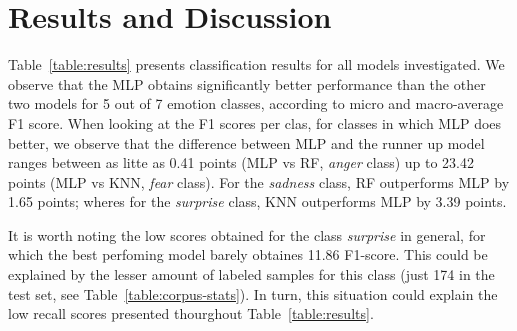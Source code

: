 \documentclass[11pt,a4paper]{article}
\begin{document}


\section{Results and Discussion}

Table~\ref{table:results} presents classification results for all models investigated. We observe that the MLP obtains significantly better performance than the other two models for 5 out of 7 emotion classes, according to micro and macro-average F1 score.
When looking at the F1 scores per clas, for classes in which MLP does better, we observe that the difference between MLP and the runner up model ranges between as litte as 0.41 points (MLP vs RF, {\it anger} class) up to 23.42 points (MLP vs KNN, {\it fear} class).
For the {\it sadness} class, RF outperforms MLP by 1.65 points; wheres for the {\it surprise} class, KNN outperforms MLP by 3.39 points.

It is worth noting the low scores obtained for the class {\it surprise} in general, for which the best perfoming model barely obtaines 11.86 F1-score.
This could be explained by the lesser amount of labeled samples for this class (just 174 in the test set, see Table~\ref{table:corpus-stats}).
In turn, this situation could explain the low recall scores presented thourghout Table~\ref{table:results}.
\end{document}
